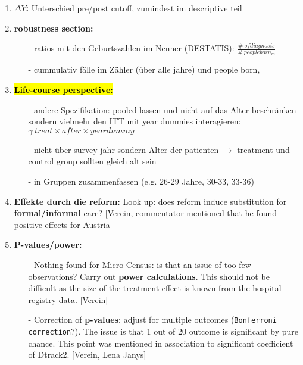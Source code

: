 \documentclass[11pt,a4paper]{article}
\begin{document}
{\begin{enumerate}
\item \textbf{$\Delta Y$:}\newline
Unterschied pre/post cutoff, zumindest im descriptive teil


\item \textbf{robustness section:}\vspace{-1em}
\begin{itemize}
\item[-] ratios mit den Geburtszahlen im Nenner (DESTATIS): $\frac{\#\ of diagnosis}{\#\ people born_m}$
\item[-] cummulativ fälle im Zähler (über alle jahre) und people born, 
\end{itemize}


\item \textbf{\hl{Life-course perspective:}}\vspace{-1em}
\begin{itemize}
\item[-]andere Spezifikation: pooled lassen und nicht auf das Alter beschränken sondern vielmehr den ITT mit year dummies interagieren: \newline
$\gamma\  treat \times after \times yeardummy$
\item[-] nicht über survey jahr sondern Alter der patienten $\rightarrow$ treatment und control group sollten gleich alt sein
\item[-] in Gruppen zusammenfassen (e.g. 26-29 Jahre, 30-33, 33-36)
\end{itemize}


\item \textbf{Effekte durch die reform:}\newline
Look up: does reform induce substitution for \textbf{formal/informal} care? [Verein, commentator mentioned that he found positive effects for Austria] 


\item \textbf{P-values/power:}\vspace{-1em}
\begin{itemize}
\item[-] Nothing found for Micro Census: is that an issue of too few observations? Carry out \textbf{power calculations}. This should not be difficult as the size of the treatment effect is known from the hospital registry data. [Verein]
\item[-] Correction of \textbf{p-values}: adjust for multiple outcomes (\texttt{Bonferroni correction}?). The issue is that 1 out of 20 outcome is significant by pure chance. This point was mentioned in association to significant coefficient of Dtrack2. [Verein, Lena Janys]
\end{itemize}



\end{enumerate}}
\end{document}
